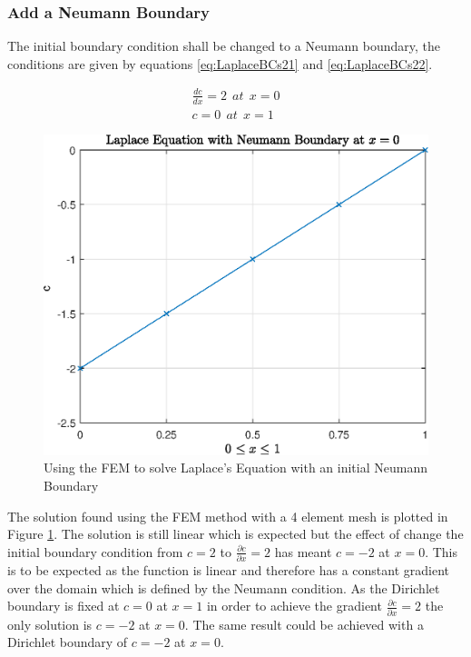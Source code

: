 \documentclass[11pt]{article}
\begin{document}
\subsubsection{Add a Neumann Boundary}
The initial boundary condition shall be changed to a Neumann boundary, the conditions are given by equations \ref{eq:LaplaceBCs21} and \ref{eq:LaplaceBCs22}.

\begin{subequations}
\begin{align}
\frac{dc}{dx} = 2 \ \ at \ \ x = 0 \label{eq:LaplaceBCs21} \\
c = 0 \ \ at \ \  x= 1 \label{eq:LaplaceBCs22}
\end{align}
\end{subequations}

\begin{figure}[h!] 
    \centering
    \includegraphics{epsLaplaceFig2}
    \caption{Using the FEM to solve Laplace's Equation with an initial Neumann Boundary}\label{fig:LaplaceFig2}
\end{figure}

The solution found using the FEM method with a 4 element mesh is plotted in Figure \ref{fig:LaplaceFig2}. The solution is still linear which is expected but the effect of change the initial boundary condition from $c = 2$ to $\frac{\partial c}{\partial x} = 2$ has meant $c = -2$ at $x = 0$. This is to be expected as the function is linear and therefore has a constant gradient over the domain which is defined by the Neumann condition. As the Dirichlet boundary is fixed at $c = 0$ at $x = 1$ in order to achieve the gradient $\frac{\partial c}{\partial x} = 2$ the only solution is $c = -2$ at $x = 0$. The same result could be achieved with a Dirichlet boundary of $c = -2$ at $x = 0$.
\end{document}

